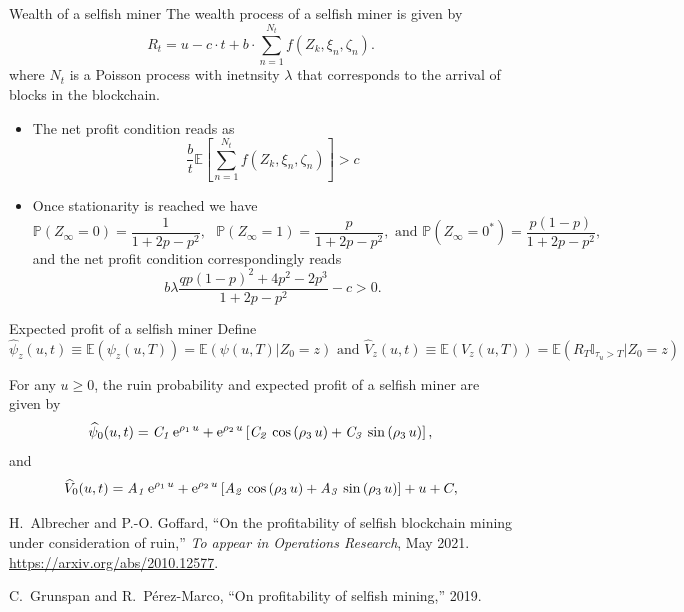 \documentclass{beamer}
\def \E{\mathbb E}
\def \w{\widehat}
\def \P {\mathbb P}
\begin{document}
\begin{frame}{Wealth of a selfish miner}
\scriptsize
The wealth process of a selfish miner is given by 
$$
R_t = u - c\cdot t +b\cdot\sum_{n=1}^{N_t} f(Z_k,\xi_n,\zeta_n ).
$$
where $N_t$ is a Poisson process with inetnsity $\lambda$ that corresponds to the arrival of blocks in the blockchain.
\begin{itemize}
  \item The net profit condition reads as 
  $$
  \frac{b}{t}\mathbb{E}\left[\sum_{n=1}^{N_t} f(Z_k,\xi_n,\zeta_n )\right] > c
  $$
  \item Once stationarity is reached we have 
  $$
\P(Z_\infty = 0)=\frac{1}{1+2p-p^2},\text{ }\P(Z_\infty = 1)=\frac{p}{1+2p-p^2},\text{ and }\P(Z_\infty = 0^{\ast})=\frac{p(1-p)}{1+2p-p^2},
$$
and the net profit condition correspondingly reads
\begin{equation*}
b\lambda\frac{qp(1-p)^2 + 4p^2-2p^3}{1+2p-p^2} - c>0.
\end{equation*}
\end{itemize}
\end{frame}
\begin{frame}{Expected profit of a selfish miner}
\scriptsize
Define 
\begin{equation*}
\w{\psi}_z(u,t)\equiv \E(\psi_z(u,T)) = \mathbb{E}\left(\psi(u,T)\Big \rvert Z_0 = z\right) \text{ and }\w{V}_z(u,t)\equiv \E(V_z(u,T)) = \mathbb{E}\left(R_T\mathbb{I}_{\tau_u>T}\Big \rvert Z_0 = z\right)
\end{equation*}
\begin{tcolorbox}[enhanced,drop shadow, title=Theorem]
For any $u\ge 0$, the ruin probability and expected profit of a selfish miner are given by
\begin{equation*}\label{ruin_selfish_app}
\w{\psi}_0(u,t) =
{\it C_1}\,{{\rm e}^{\rho_1\,u}}+{{\rm e}^{\rho_2\,u}} \left[ {\it C_2}\,
\cos \left( \rho_3\,u \right) +{\it C_3}\,\sin \left( \rho_3\,u \right)\right],
\end{equation*}
and 
\begin{equation*}
\w{V}_0(u,t)={\it A_1}\,{{\rm e}^{\rho_1\,u}}+{{\rm e}^{\rho_2\,u}} \left[ {\it A_2}\,
\cos \left( \rho_3\,u \right) +{\it A_3}\,\sin \left( \rho_3\,u \right)\right] +u+C,\label{thisone}
\end{equation*}
\end{tcolorbox}
\tiny
  \begin{thebibliography}{1}

H.~Albrecher and P.-O. Goffard, ``{On the profitability of selfish blockchain
  mining under consideration of ruin},'' {\em To appear in Operations
  Research}, May 2021.
\newblock \url{https://arxiv.org/abs/2010.12577}.

C.~Grunspan and R.~Pérez-Marco, ``On profitability of selfish mining,'' 2019.
\end{thebibliography}
\end{frame}
\end{document}
